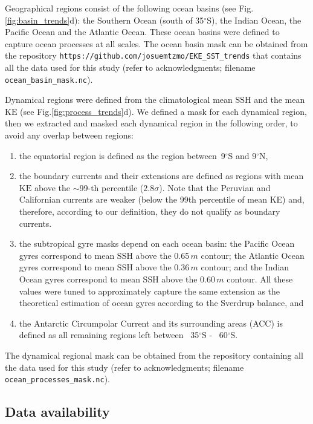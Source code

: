 \documentclass{nature}
\newcommand{\KE}{\text{KE}}
\newcommand{\SSH}{\text{SSH}}
\begin{document}
Geographical regions consist of the following ocean basins (see Fig.\ref{fig:basin_trends}d): the Southern Ocean (south of 35$^\circ$S), the Indian Ocean, the Pacific Ocean and the Atlantic Ocean. These ocean basins were deﬁned to capture ocean processes at all scales. The ocean basin mask can be obtained from the repository \texttt{https://github.com/josuemtzmo/EKE\_SST\_trends} that contains all the data used for this study (refer to acknowledgments; filename \texttt{ocean\_basin\_mask.nc}).

Dynamical regions were defined from the climatological mean $\SSH$ and the mean $\KE$ (see Fig.\ref{fig:process_trends}d). We defined a mask for each dynamical region, then we extracted and masked each dynamical region in the following order, to avoid any overlap between regions:
\begin{enumerate}
	\item the equatorial region is defined as the region between~9$^\circ$S and 9$^\circ$N,
	\item the boundary currents and their extensions are defined as regions with mean $\KE$ above the $\sim$99-th percentile ($2.8\sigma$). Note that the Peruvian and Californian currents are weaker (below the 99th percentile of mean KE) and, therefore, according to our definition, they do not qualify as boundary currents.
	\item the subtropical gyre masks depend on each ocean basin: the Pacific Ocean gyres correspond to mean $\SSH$ above the 0.65$\,m$ contour; the Atlantic Ocean gyres correspond to mean $\SSH$ above the 0.36$\,m$ contour; and the Indian Ocean gyres correspond to mean $\SSH$ above the 0.60$\,m$ contour. All these values were tuned to approximately capture the same extension as the theoretical estimation of ocean gyres according to the Sverdrup balance, and 
	\item the Antarctic Circumpolar Current and its surrounding areas (ACC) is defined as all remaining regions left between ~35$^\circ$S - ~60$^\circ$S.
\end{enumerate}
The dynamical regional mask can be obtained from the repository containing all the data used for this study (refer to acknowledgments; filename \texttt{ocean\_processes\_mask.nc}).

\subsection{Data availability}\mbox{}\vspace{-1.5em}
\end{document}
